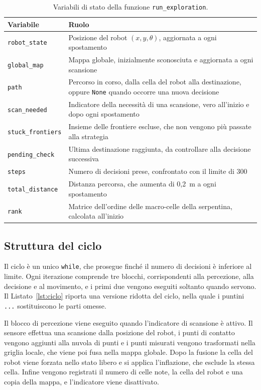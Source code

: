 \begin{table}[!htb]
    \centering
    \small
    \begin{tabular}{@{}lp{}@{}}
        \toprule
        Variabile & Ruolo \\
        \midrule
        \texttt{robot\_state} & Posizione del robot $(x, y, \theta)$, aggiornata a ogni spostamento \\
        \texttt{global\_map} & Mappa globale, inizialmente sconosciuta e aggiornata a ogni scansione \\
        \texttt{path} & Percorso in corso, dalla cella del robot alla destinazione, oppure \texttt{None} quando occorre una nuova decisione \\
        \texttt{scan\_needed} & Indicatore della necessità di una scansione, vero all'inizio e dopo ogni spostamento \\
        \texttt{stuck\_frontiers} & Insieme delle frontiere escluse, che non vengono più passate alla strategia \\
        \texttt{pending\_check} & Ultima destinazione raggiunta, da controllare alla decisione successiva \\
        \texttt{steps} & Numero di decisioni prese, confrontato con il limite di 300 \\
        \texttt{total\_distance} & Distanza percorsa, che aumenta di 0,2~m a ogni spostamento \\
        \texttt{rank} & Matrice dell'ordine delle macro-celle della serpentina, calcolata all'inizio \\
        \bottomrule
    \end{tabular}
    \caption{Variabili di stato della funzione \texttt{run\_exploration}.}
    \label{tab:stato}
\end{table}

\subsection{Struttura del ciclo}
\label{sec:struttura_ciclo}

Il ciclo è un unico \texttt{while}, che prosegue finché il numero di decisioni è inferiore al limite. Ogni iterazione comprende tre blocchi, corrispondenti alla percezione, alla decisione e al movimento, e i primi due vengono eseguiti soltanto quando servono. Il Listato~\ref{lst:ciclo} riporta una versione ridotta del ciclo, nella quale i puntini \texttt{...} sostituiscono le parti omesse.

Il blocco di percezione viene eseguito quando l'indicatore di scansione è attivo. Il sensore effettua una scansione dalla posizione del robot, i punti di contatto vengono aggiunti alla nuvola di punti e i punti misurati vengono trasformati nella griglia locale, che viene poi fusa nella mappa globale. Dopo la fusione la cella del robot viene forzata nello stato libero e si applica l'inflazione, che esclude la stessa cella. Infine vengono registrati il numero di celle note, la cella del robot e una copia della mappa, e l'indicatore viene disattivato.

